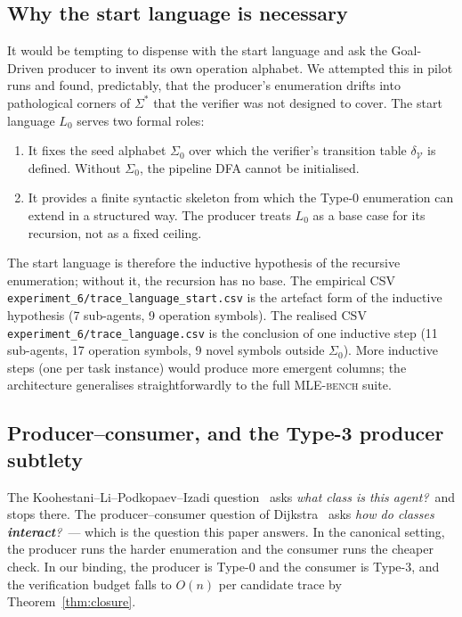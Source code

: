 \subsection{Why the start language is necessary}

It would be tempting to dispense with the start language and ask
the Goal-Driven producer to invent its own operation alphabet.
We attempted this in pilot runs and found, predictably, that the
producer's enumeration drifts into pathological corners of
$\Sigma^*$ that the verifier was not designed to cover.  The
start language $L_0$ serves two formal roles:
\begin{enumerate}
\item It fixes the seed alphabet $\Sigma_0$ over which the
verifier's transition table $\delta_\mathcal{V}$ is defined.  Without
$\Sigma_0$, the pipeline DFA cannot be initialised.
\item It provides a finite syntactic skeleton from which the
Type-0 enumeration can extend in a structured way.  The producer
treats $L_0$ as a base case for its recursion, not as a fixed
ceiling.
\end{enumerate}
The start language is therefore the inductive hypothesis of the
recursive enumeration; without it, the recursion has no base.
The empirical CSV \texttt{experiment\_6/trace\_language\_start.csv} is the
artefact form of the inductive hypothesis (7 sub-agents, 9 operation
symbols).  The realised CSV \texttt{experiment\_6/trace\_language.csv}
is the conclusion of one inductive step (11 sub-agents, 17 operation
symbols, 9 novel symbols outside $\Sigma_0$).  More inductive steps (one per task instance)
would produce more emergent columns; the architecture
generalises straightforwardly to the full \textsc{MLE-bench}
suite.

\subsection{Producer--consumer, and the Type-3 producer subtlety}
\label{sec:type3-producer}

The Koohestani--Li--Podkopaev--Izadi
question~\cite{koohestani2025automata} asks \emph{what class is
this agent?}\ and stops there.  The producer--consumer
question of Dijkstra~\cite{dijkstra1968cooperating} asks
\emph{how do classes \textbf{interact}?}\ --- which is the
question this paper answers.  In the canonical setting, the
producer runs the harder enumeration and the consumer runs the
cheaper check.  In our binding, the producer is Type-0 and the
consumer is Type-3, and the verification budget falls to $O(n)$
per candidate trace by Theorem~\ref{thm:closure}.

